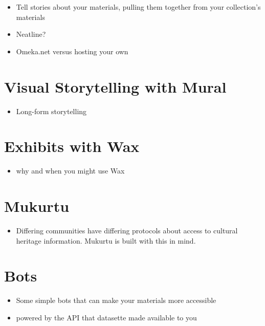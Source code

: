 \documentclass[
]{book}
\providecommand{\tightlist}{%
  \setlength{\itemsep}{0pt}\setlength{\parskip}{0pt}}
\begin{document}
\begin{itemize}
\tightlist
\item
  Tell stories about your materials, pulling them together from your collection's materials
\item
  Neatline?
\item
  Omeka.net versus hosting your own
\end{itemize}

\hypertarget{mural}{%
\section{Visual Storytelling with Mural}\label{mural}}

\begin{itemize}
\tightlist
\item
  Long-form storytelling
\end{itemize}

\hypertarget{wax}{%
\section{Exhibits with Wax}\label{wax}}

\begin{itemize}
\tightlist
\item
  why and when you might use Wax
\end{itemize}

\hypertarget{mukurtu}{%
\section{Mukurtu}\label{mukurtu}}

\begin{itemize}
\tightlist
\item
  Differing communities have differing protocols about access to cultural heritage information. Mukurtu is built with this in mind.
\end{itemize}

\hypertarget{bots}{%
\section{Bots}\label{bots}}

\begin{itemize}
\tightlist
\item
  Some simple bots that can make your materials more accessible
\item
  powered by the API that datasette made available to you
\end{itemize}
\end{document}
